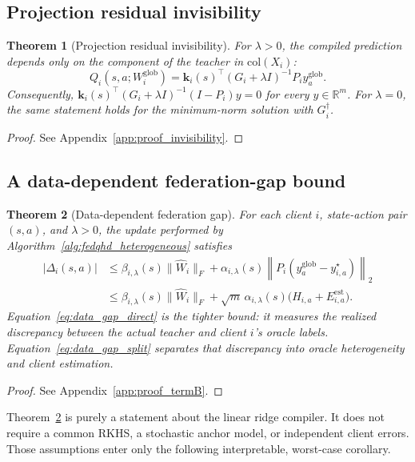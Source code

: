 \documentclass[sigconf,anonymous]{aamas}
\theoremstyle{plain}
\newtheorem{theorem}{Theorem}
\theoremstyle{definition}
\theoremstyle{remark}
\begin{document}
\subsection{Projection residual invisibility}

\begin{theorem}[Projection residual invisibility]
\label{thm:invisibility}
For $\lambda>0$, the compiled prediction depends only on the component of
the teacher in $\mathrm{col}(X_i)$:
\[
Q_i(s,a;W_i^{\mathrm{glob}})
=
\mathbf k_i(s)^\top(G_i+\lambda I)^{-1}
P_i y^{\mathrm{glob}}_a.
\]
Consequently,
$\mathbf k_i(s)^\top(G_i+\lambda I)^{-1}(I-P_i)y=0$
for every $y\in\mathbb R^m$.  For $\lambda=0$, the same statement holds
for the minimum-norm solution with $G_i^\dagger$.
\end{theorem}

\begin{proof}
See Appendix~\ref{app:proof_invisibility}.
\end{proof}

\subsection{A data-dependent federation-gap bound}

\begin{theorem}[Data-dependent federation gap]
\label{thm:fed_gap_main}
For each client $i$, state-action pair $(s,a)$, and $\lambda>0$, the
update performed by Algorithm~\ref{alg:fedqhd_heterogeneous} satisfies
\begin{align}
|\Delta_i(s,a)|
&\le
\beta_{i,\lambda}(s)\|\hat W_i\|_F
+
\alpha_{i,\lambda}(s)
\left\|P_i(y^{\mathrm{glob}}_a-y^\star_{i,a})\right\|_2
\label{eq:data_gap_direct}\\
&\le
\beta_{i,\lambda}(s)\|\hat W_i\|_F
+
\sqrt m\,\alpha_{i,\lambda}(s)
\bigl(H_{i,a}+E_{i,a}^{\mathrm{est}}\bigr).
\label{eq:data_gap_split}
\end{align}
Equation~\eqref{eq:data_gap_direct} is the tighter bound: it measures the
realized discrepancy between the actual teacher and client $i$'s oracle
labels.  Equation~\eqref{eq:data_gap_split} separates that discrepancy
into oracle heterogeneity and client estimation.
\end{theorem}

\begin{proof}
See Appendix~\ref{app:proof_termB}.
\end{proof}

Theorem~\ref{thm:fed_gap_main} is purely a statement about the linear
ridge compiler.  It does not require a common RKHS, a stochastic anchor
model, or independent client errors.  Those assumptions enter only the
following interpretable, worst-case corollary.
\end{document}
